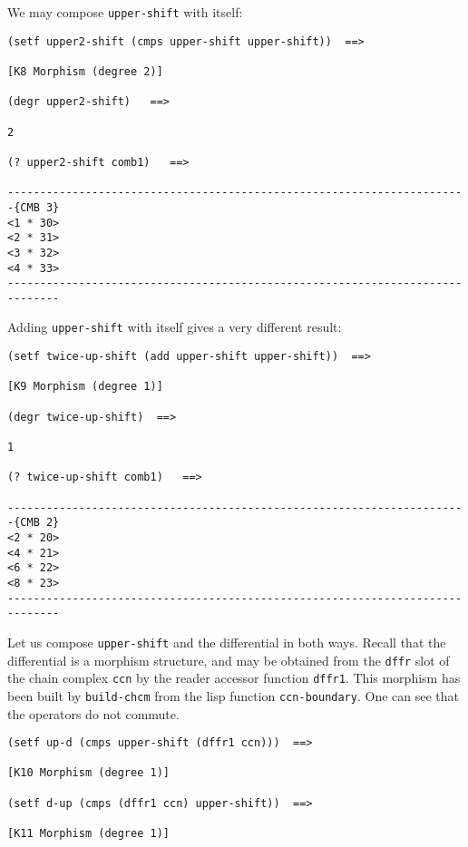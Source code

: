 We may compose {\tt upper-shift} with itself:
{\footnotesize\begin{verbatim}
(setf upper2-shift (cmps upper-shift upper-shift))  ==>

[K8 Morphism (degree 2)]

(degr upper2-shift)   ==>

2

(? upper2-shift comb1)   ==>

-----------------------------------------------------------------------{CMB 3}
<1 * 30>
<2 * 31>
<3 * 32>
<4 * 33>
------------------------------------------------------------------------------
\end{verbatim}}
Adding {\tt upper-shift} with itself gives a very different result:
{\footnotesize\begin{verbatim}
(setf twice-up-shift (add upper-shift upper-shift))  ==>

[K9 Morphism (degree 1)]

(degr twice-up-shift)  ==>

1

(? twice-up-shift comb1)   ==>

-----------------------------------------------------------------------{CMB 2}
<2 * 20>
<4 * 21>
<6 * 22>
<8 * 23>
------------------------------------------------------------------------------
\end{verbatim}}
Let us compose {\tt upper-shift} and the differential in both ways.
Recall that the differential is a morphism structure, and
may be obtained from the {\tt dffr} slot  of the chain complex {\tt ccn}
by the reader accessor function {\tt dffr1}. This morphism has
been built by {\tt build-chcm} from the lisp function {\tt ccn-boundary}. One can
see that the operators do not commute.
{\footnotesize\begin{verbatim}
(setf up-d (cmps upper-shift (dffr1 ccn)))  ==>

[K10 Morphism (degree 1)]

(setf d-up (cmps (dffr1 ccn) upper-shift))  ==>

[K11 Morphism (degree 1)]
\end{verbatim}}
\newpage
